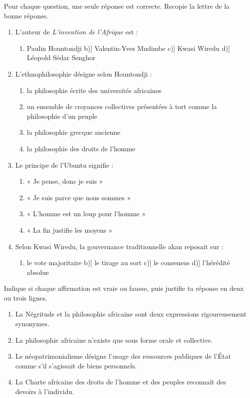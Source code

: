 \documentclass[11pt]{article}
\newcommand{\cle}[1]{{\popxbold\color{popdark}#1}}
\begin{document}
\begin{exercice}
Pour chaque question, une seule réponse est correcte. Recopie la lettre de la bonne réponse.
\begin{enumerate}
\item L'auteur de \emph{L'invention de l'Afrique} est :
\begin{enumerate}
\item[a)] Paulin Hountondji \quad b)] Valentin-Yves Mudimbe \quad c)] Kwasi Wiredu \quad d)] Léopold Sédar Senghor
\end{enumerate}
\item L'ethnophilosophie désigne selon Hountondji :
\begin{enumerate}
\item[a)] la philosophie écrite des universités africaines
\item[b)] un ensemble de croyances collectives présentées à tort comme la philosophie d'un peuple
\item[c)] la philosophie grecque ancienne
\item[d)] la philosophie des droits de l'homme
\end{enumerate}
\item Le principe de l'\cle{Ubuntu} signifie :
\begin{enumerate}
\item[a)] « Je pense, donc je suis »
\item[b)] « Je suis parce que nous sommes »
\item[c)] « L'homme est un loup pour l'homme »
\item[d)] « La fin justifie les moyens »
\end{enumerate}
\item Selon Kwasi Wiredu, la gouvernance traditionnelle akan reposait sur :
\begin{enumerate}
\item[a)] le vote majoritaire \quad b)] le tirage au sort \quad c)] le consensus \quad d)] l'hérédité absolue
\end{enumerate}
\end{enumerate}
\end{exercice}

\begin{exercice}
Indique si chaque affirmation est vraie ou fausse, puis justifie ta réponse en deux ou trois lignes.
\begin{enumerate}
\item La Négritude et la philosophie africaine sont deux expressions rigoureusement synonymes.
\item La philosophie africaine n'existe que sous forme orale et collective.
\item Le néopatrimonialisme désigne l'usage des ressources publiques de l'État comme s'il s'agissait de biens personnels.
\item La Charte africaine des droits de l'homme et des peuples reconnaît des devoirs à l'individu.
\end{enumerate}
\end{exercice}
\end{document}

